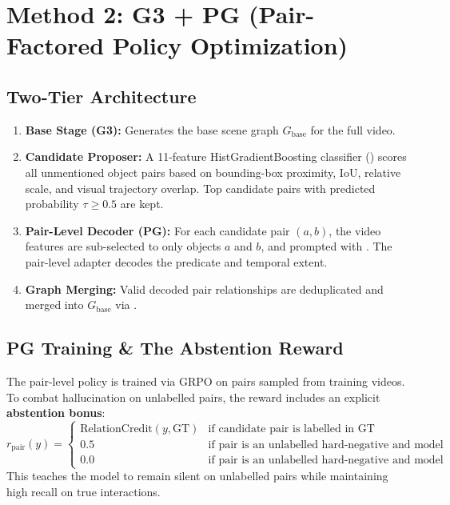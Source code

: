 \documentclass[11pt,a4paper]{article}
\begin{document}
\section{Method 2: G3 + PG (Pair-Factored Policy Optimization)}

\subsection{Two-Tier Architecture}
\begin{enumerate}
    \item \textbf{Base Stage (G3):} Generates the base scene graph $G_{\text{base}}$ for the full video.
    \item \textbf{Candidate Proposer:} A 11-feature HistGradientBoosting classifier () scores all unmentioned object pairs based on bounding-box proximity, IoU, relative scale, and visual trajectory overlap. Top candidate pairs with predicted probability $\tau \ge 0.5$ are kept.
    \item \textbf{Pair-Level Decoder (PG):} For each candidate pair $(a, b)$, the video features are sub-selected to only objects $a$ and $b$, and prompted with . The pair-level adapter decodes the predicate and temporal extent.
    \item \textbf{Graph Merging:} Valid decoded pair relationships are deduplicated and merged into $G_{\text{base}}$ via .
\end{enumerate}

\subsection{PG Training \& The Abstention Reward}
The pair-level policy is trained via GRPO on pairs sampled from training videos. To combat hallucination on unlabelled pairs, the reward includes an explicit \textbf{abstention bonus}:
\begin{equation}
r_{\text{pair}}(y) = 
\begin{cases}
\text{RelationCredit}(y, \text{GT}) & \text{if candidate pair is labelled in GT} \\
0.5 & \text{if pair is an unlabelled hard-negative and model predicts ``none''} \\
0.0 & \text{if pair is an unlabelled hard-negative and model invents a relation}
\end{cases}
\end{equation}
This teaches the model to remain silent on unlabelled pairs while maintaining high recall on true interactions.
\end{document}

